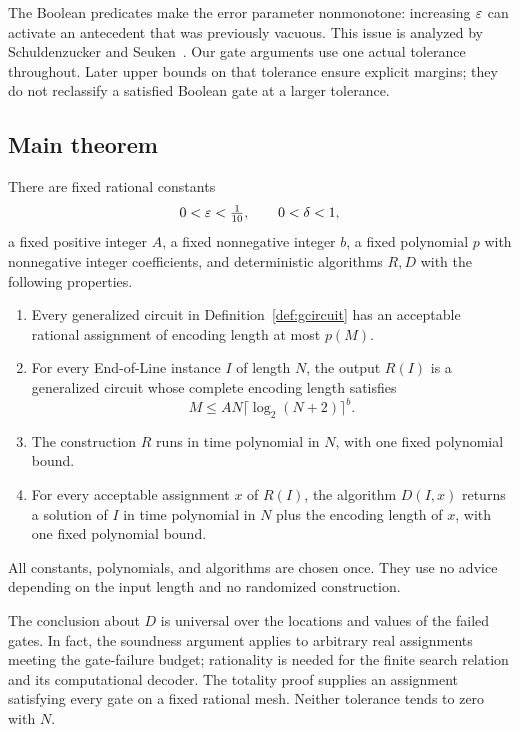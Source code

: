 The Boolean predicates make the error parameter nonmonotone: increasing
$\varepsilon$ can activate an antecedent that was previously vacuous. This issue
is analyzed by Schuldenzucker and Seuken~\cite[Proposition~1]{SchuldenzuckerSeuken2019}.
Our gate arguments use one actual tolerance throughout. Later upper bounds
on that tolerance ensure explicit margins; they do not reclassify a
satisfied Boolean gate at a larger tolerance.

\subsection{Main theorem}

\begin{samepage}
\begin{theorem}\label{thm:main}
There are fixed rational constants
\[
 0<\varepsilon<\tfrac1{10},\qquad 0<\delta<1,
\]
a fixed positive integer $A$, a fixed nonnegative integer $b$, a fixed
polynomial $p$ with nonnegative integer coefficients, and deterministic
algorithms $R,D$ with the following properties.
\begin{enumerate}[label=\textup{(\roman*)}]
\item Every generalized circuit in Definition~\ref{def:gcircuit} has an
acceptable rational assignment of encoding length at most $p(M)$.
\item For every End-of-Line instance $I$ of length $N$, the output $R(I)$
is a generalized circuit whose complete encoding length satisfies
\[
 M\leq A N\bigl\lceil\log_2(N+2)\bigr\rceil^b.
\]
\item The construction $R$ runs in time polynomial in $N$, with one fixed
polynomial bound.
\item For every acceptable assignment $x$ of $R(I)$, the algorithm $D(I,x)$
returns a solution of $I$ in time polynomial in $N$ plus the encoding
length of $x$, with one fixed polynomial bound.
\end{enumerate}
All constants, polynomials, and algorithms are chosen once. They use no
advice depending on the input length and no randomized construction.
\end{theorem}
\end{samepage}

The conclusion about $D$ is universal over the locations and values of
the failed gates. In fact, the soundness argument applies to arbitrary
real assignments meeting the gate-failure budget; rationality is needed
for the finite search relation and its computational decoder. The totality
proof supplies an assignment satisfying every gate on a fixed rational
mesh. Neither tolerance tends to zero with $N$.

